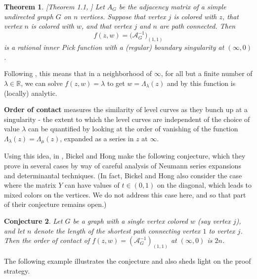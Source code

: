 \documentclass[12pt]{amsart}
\newtheorem{theorem}{Theorem}[section]
\newtheorem{conjecture}[theorem]{Conjecture}
\theoremstyle{remark}
\newcommand{\A}{\mathcal{A}}
\newcommand{\R}{\mathbb{R}}
\newcommand{\inv}{^{-1}}
\newcommand\la{\lambda}
\numberwithin{equation}{section}
\newcommand{\dfn}[1]{{\bf #1}\index{#1}}
\newcommand{\cA}{\mathcal{A}}
\begin{document}
\begin{theorem}\label{blackmagicbetterbickel}[Theorem 1.1,  \cite{bickelhong}]
Let $A_G$ be the adjacency matrix of a simple undirected graph $G$ on $n$ vertices. Suppose that vertex $j$ is colored with $z$, that vertex $n$ is colored with $w$, and that vertex $j$ and $n$ are path connected.  Then
\[
f(z, w) = \mathcal (\cA_G^{-1})_{(1,1)}
\]
is a rational inner Pick function with a (regular) boundary singularity at $(\infty,0)$.
\end{theorem}



Following \cite{bps2}, this means that in a neighborhood of $\infty$, for all but a finite number of $\la \in \R$, we can solve $f(z,w) = \lambda$ to get $w = \Lambda_\la(z)$ and by \cite{bps2} this function is (locally) analytic.

\dfn{Order of contact} measures the similarity of level curves as they bunch up at a singularity - the extent to which the level curves are independent of the choice of value $\la$ can be quantified by looking at the order of vanishing of the function $\Lambda_\la(z) = \Lambda_\mu(z)$, expanded as a series in $z$ at $\infty$.

Using this idea, in \cite{bickelhong}, Bickel and Hong make the following conjecture, which they prove in several cases by way of careful analysis of Neumann series expansions and determinantal techniques. (In fact, Bickel and Hong also consider the case where the matrix $Y$ can have values of $t \in (0,1)$ on the diagonal, which leads to mixed colors on the vertices. We do not address this case here, and so that part of their conjecture remains open.)
\begin{conjecture}\label{conjecture1}
Let $G$ be a graph with a single vertex colored $w$ (say vertex $j$), and let $n$ denote the length of the shortest path connecting vertex $1$ to vertex $j$. Then the order of contact of $f(z,w) = (\A_G\inv)_{(1,1)}$ at $(\infty, 0)$ is $2n$.
\end{conjecture}

The following example illustrates the conjecture and also sheds light on the proof strategy.
\end{document}
